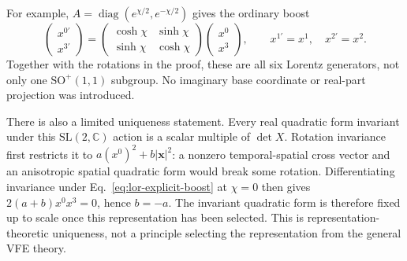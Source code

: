 For example, $A=\operatorname{diag}(e^{\chi/2},e^{-\chi/2})$ gives the ordinary boost
\begin{equation}
\begin{pmatrix}x^{0\prime}\\x^{3\prime}\end{pmatrix}
=\begin{pmatrix}\cosh\chi&\sinh\chi\\\sinh\chi&\cosh\chi\end{pmatrix}
\begin{pmatrix}x^0\\x^3\end{pmatrix},\qquad
x^{1\prime}=x^1,\quad x^{2\prime}=x^2.
\label{eq:lor-explicit-boost}
\end{equation}
Together with the rotations in the proof, these are all six Lorentz generators, not only one $\mathrm{SO}^{+}(1,1)$ subgroup. No imaginary base coordinate or real-part projection was introduced.

There is also a limited uniqueness statement. Every real quadratic form invariant under this $\mathrm{SL}(2,\mathbb C)$ action is a scalar multiple of $\det X$. Rotation invariance first restricts it to $a(x^0)^2+b|\boldsymbol x|^2$: a nonzero temporal-spatial cross vector and an anisotropic spatial quadratic form would break some rotation. Differentiating invariance under Eq.~\eqref{eq:lor-explicit-boost} at $\chi=0$ then gives $2(a+b)x^0x^3=0$, hence $b=-a$. The invariant quadratic form is therefore fixed up to scale once this representation has been selected. This is representation-theoretic uniqueness, not a principle selecting the representation from the general VFE theory.

